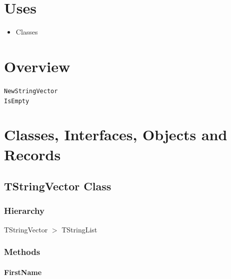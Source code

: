 \documentclass{report}
\newif\ifpdf
\begin{document}
\section{Uses}
\begin{itemize}
\item \begin{ttfamily}Classes\end{ttfamily}\end{itemize}
\section{Overview}
\begin{description}
\item[\texttt{\begin{ttfamily}TStringVector\end{ttfamily} Class}]
\end{description}
\begin{description}
\item[\texttt{NewStringVector}]
\item[\texttt{IsEmpty}]
\end{description}
\section{Classes, Interfaces, Objects and Records}
\ifpdf
\subsection*{\large{\textbf{TStringVector Class}}\normalsize\hspace{1ex}\hrulefill}
\else
\subsection*{TStringVector Class}
\fi
\label{PasDoc_StringVector.TStringVector}
\subsubsection*{\large{\textbf{Hierarchy}}\normalsize\hspace{1ex}\hfill}
TStringVector {$>$} TStringList
\subsubsection*{\large{\textbf{Methods}}\normalsize\hspace{1ex}\hfill}
\paragraph*{FirstName}\hspace*{\fill}
\end{document}
